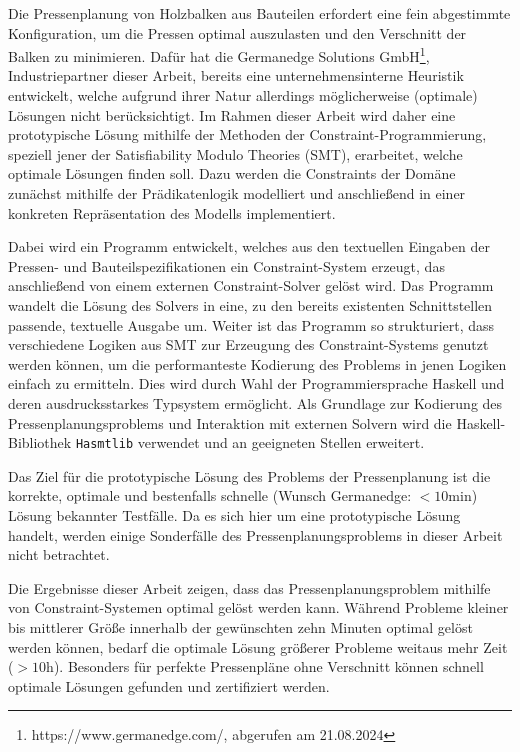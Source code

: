\abstract
\label{Abstrakt}

Die Pressenplanung von Holzbalken aus Bauteilen erfordert eine fein abgestimmte Konfiguration, um die Pressen optimal auszulasten und den Verschnitt der Balken zu minimieren.
Dafür hat die Germanedge Solutions GmbH\footnote{https://www.germanedge.com/, abgerufen am 21.08.2024}, Industriepartner dieser Arbeit, bereits eine unternehmensinterne Heuristik entwickelt, welche aufgrund ihrer Natur allerdings möglicherweise (optimale) Lösungen nicht berücksichtigt.
Im Rahmen dieser Arbeit wird daher eine prototypische Lösung mithilfe der Methoden der Constraint-Programmierung, speziell jener der Satisfiability Modulo Theories (SMT), erarbeitet, welche optimale Lösungen finden soll.
Dazu werden die Constraints der Domäne zunächst mithilfe der Prädikatenlogik modelliert und anschließend in einer konkreten Repräsentation des Modells implementiert.

Dabei wird ein Programm entwickelt, welches aus den textuellen Eingaben der Pressen- und Bauteilspezifikationen ein Constraint-System erzeugt, das anschließend von einem externen Constraint-Solver gelöst wird.
Das Programm wandelt die Lösung des Solvers in eine, zu den bereits existenten Schnittstellen passende, textuelle Ausgabe um.
Weiter ist das Programm so strukturiert, dass verschiedene Logiken aus SMT zur Erzeugung des Constraint-Systems genutzt werden können,
um die performanteste Kodierung des Problems in jenen Logiken einfach zu ermitteln.
Dies wird durch Wahl der Programmiersprache Haskell und deren ausdrucksstarkes Typsystem ermöglicht.
Als Grundlage zur Kodierung des Pressenplanungsproblems und Interaktion mit externen Solvern
wird die Haskell-Bibliothek \texttt{Hasmtlib} \cite{hasmtlib} verwendet und an geeigneten Stellen erweitert.

Das Ziel für die prototypische Lösung des Problems der Pressenplanung ist die korrekte, optimale und bestenfalls schnelle (Wunsch Germanedge: $< 10 \text{min}$) Lösung bekannter Testfälle.
Da es sich hier um eine prototypische Lösung handelt, werden einige Sonderfälle des Pressenplanungsproblems in dieser Arbeit nicht betrachtet.

Die Ergebnisse dieser Arbeit zeigen, dass das Pressenplanungsproblem mithilfe von Constraint-Systemen optimal gelöst werden kann.
Während Probleme kleiner bis mittlerer Größe innerhalb der gewünschten zehn Minuten optimal gelöst werden können, bedarf die optimale Lösung
größerer Probleme weitaus mehr Zeit ($> 10 \text{h}$).
Besonders für perfekte Pressenpläne ohne Verschnitt können schnell optimale Lösungen gefunden und zertifiziert werden.